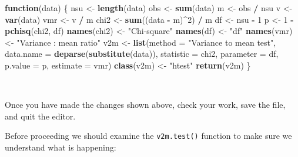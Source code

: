 \documentclass[12pt,a4paper]{book}
\newenvironment{Shaded}{\begin{snugshade}}{\end{snugshade}}
\newcommand{\ControlFlowTok}[1]{\textcolor[rgb]{0.13,0.29,0.53}{\textbf{#1}}}
\newcommand{\DataTypeTok}[1]{\textcolor[rgb]{0.13,0.29,0.53}{#1}}
\newcommand{\DecValTok}[1]{\textcolor[rgb]{0.00,0.00,0.81}{#1}}
\newcommand{\KeywordTok}[1]{\textcolor[rgb]{0.13,0.29,0.53}{\textbf{#1}}}
\newcommand{\NormalTok}[1]{#1}
\newcommand{\OperatorTok}[1]{\textcolor[rgb]{0.81,0.36,0.00}{\textbf{#1}}}
\newcommand{\StringTok}[1]{\textcolor[rgb]{0.31,0.60,0.02}{#1}}
\theoremstyle{definition}
\theoremstyle{definition}
\theoremstyle{definition}
\theoremstyle{remark}
\begin{document}
\begin{Shaded}
\begin{Highlighting}[]
\ControlFlowTok{function}\NormalTok{(data) \{}
\NormalTok{  nsu <-}\StringTok{ }\KeywordTok{length}\NormalTok{(data)}
\NormalTok{  obs <-}\StringTok{ }\KeywordTok{sum}\NormalTok{(data)}
\NormalTok{  m <-}\StringTok{ }\NormalTok{obs }\OperatorTok{/}\StringTok{ }\NormalTok{nsu}
\NormalTok{  v <-}\StringTok{ }\KeywordTok{var}\NormalTok{(data)}
\NormalTok{  vmr <-}\StringTok{ }\NormalTok{v }\OperatorTok{/}\StringTok{ }\NormalTok{m}
\NormalTok{  chi2 <-}\StringTok{ }\KeywordTok{sum}\NormalTok{((data }\OperatorTok{-}\StringTok{ }\NormalTok{m)}\OperatorTok{^}\DecValTok{2}\NormalTok{) }\OperatorTok{/}\StringTok{ }\NormalTok{m}
\NormalTok{  df <-}\StringTok{ }\NormalTok{nsu }\OperatorTok{-}\StringTok{ }\DecValTok{1}
\NormalTok{  p <-}\StringTok{ }\DecValTok{1} \OperatorTok{-}\StringTok{ }\KeywordTok{pchisq}\NormalTok{(chi2, df)}
  \KeywordTok{names}\NormalTok{(chi2) <-}\StringTok{ "Chi-square"}
  \KeywordTok{names}\NormalTok{(df) <-}\StringTok{ "df"}
  \KeywordTok{names}\NormalTok{(vmr) <-}\StringTok{ "Variance : mean ratio"}
\NormalTok{  v2m <-}\StringTok{ }\KeywordTok{list}\NormalTok{(}\DataTypeTok{method =} \StringTok{"Variance to mean test"}\NormalTok{,}
              \DataTypeTok{data.name =} \KeywordTok{deparse}\NormalTok{(}\KeywordTok{substitute}\NormalTok{(data)),}
              \DataTypeTok{statistic =}\NormalTok{ chi2,}
              \DataTypeTok{parameter =}\NormalTok{ df,}
              \DataTypeTok{p.value =}\NormalTok{ p,}
              \DataTypeTok{estimate =}\NormalTok{ vmr)}
  \KeywordTok{class}\NormalTok{(v2m) <-}\StringTok{ "htest"}
  \KeywordTok{return}\NormalTok{(v2m)}
\NormalTok{\}}
\end{Highlighting}
\end{Shaded}

~

Once you have made the changes shown above, check your work, save the
file, and quit the editor.

Before proceeding we should examine the \texttt{v2m.test()} function to
make sure we understand what is happening:
\end{document}
